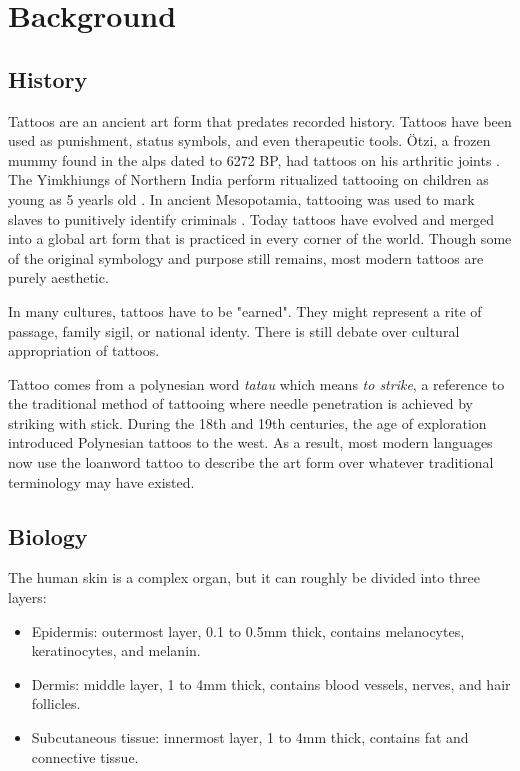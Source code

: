\documentclass[11pt]{article}
\begin{document}
\section{Background}

\subsection{History}

Tattoos are an ancient art form that predates recorded history.
Tattoos have been used as punishment, status symbols, and even therapeutic tools.
Ötzi, a frozen mummy found in the alps dated to 6272 BP, had tattoos on his arthritic joints \cite{deterwolf_worlds_oldest}.
The Yimkhiungs of Northern India perform ritualized tattooing on children as young as 5 yearls old \cite{kluger2015cultural}.
In ancient Mesopotamia, tattooing was used to mark slaves to punitively identify criminals \cite{hawken2022tattooing}.
Today tattoos have evolved and merged into a global art form that is practiced in every corner of the world.
Though some of the original symbology and purpose still remains, most modern tattoos are purely aesthetic.

In many cultures, tattoos have to be "earned". They might represent a rite of passage, family sigil, or national identy. There is still debate over cultural appropriation of tattoos.

Tattoo comes from a polynesian word \textit{tatau} which means \textit{to strike}, a reference to the traditional method of tattooing where needle penetration is achieved by striking with stick.
During the 18th and 19th centuries, the age of exploration introduced Polynesian tattoos to the west.
As a result, most modern languages now use the loanword tattoo to describe the art form over whatever traditional terminology may have existed.

\subsection{Biology}

The human skin is a complex organ, but it can roughly be divided into three layers:

\begin{itemize}
    \item Epidermis: outermost layer, 0.1 to 0.5mm thick, contains melanocytes, keratinocytes, and melanin.
    \item Dermis: middle layer, 1 to 4mm thick, contains blood vessels, nerves, and hair follicles.
    \item Subcutaneous tissue: innermost layer, 1 to 4mm thick, contains fat and connective tissue.
\end{itemize}
\end{document}
